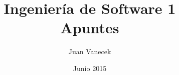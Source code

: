 \title{Ingenier\'ia de Software 1 \\ Apuntes}
\author{Juan Vanecek}
\date{Junio 2015}
\begin{titlepage}
 \maketitle
\end{titlepage}
